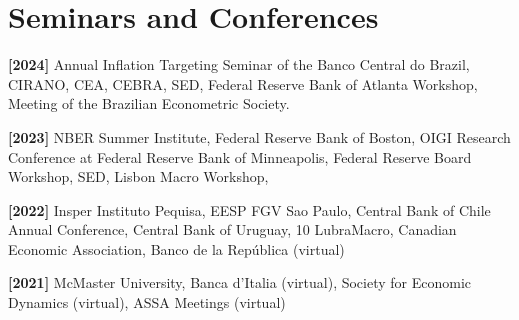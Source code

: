 \documentclass[11pt,letterpaper]{article}
\renewenvironment{itemize}{
  \begin{list}{}{
      \setlength{\leftmargin}{1.5em}
      \setlength{\itemsep}{0.25em}
      \setlength{\parskip}{0pt}
      \setlength{\parsep}{0.25em}
    }
}{
  \end{list}
}
\begin{document}

\section*{Seminars and Conferences}\begin{itemize} 
    \item \textbf{[2024]} Annual Inflation Targeting Seminar of the Banco Central do Brazil, CIRANO, CEA, CEBRA, SED, Federal Reserve Bank of Atlanta Workshop, Meeting of the Brazilian Econometric Society.
    \item \textbf{[2023]} NBER Summer Institute,  Federal Reserve Bank of Boston,  OIGI Research Conference at Federal Reserve Bank of Minneapolis, Federal Reserve Board Workshop, SED, Lisbon Macro Workshop,
    \item \textbf{[2022]} Insper Instituto Pequisa, EESP FGV Sao Paulo, Central Bank of Chile Annual Conference, Central Bank of Uruguay, 10 LubraMacro, Canadian Economic Association, Banco de la República (virtual) 
    \item \textbf{[2021]} McMaster University, Banca d'Italia (virtual), Society for Economic Dynamics (virtual), ASSA Meetings (virtual)

\end{itemize}



\iffalse
\end{document}
